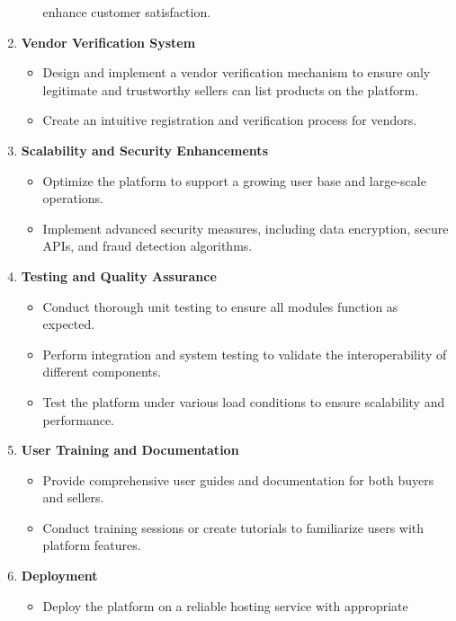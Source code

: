 \documentclass[12pt]{report}
\begin{document}
\begin{enumerate}
\begin{itemize}
		            enhance customer satisfaction.
	      \end{itemize}
	\item \textbf{Vendor Verification System}
	      \begin{itemize}
		      \item Design and implement a vendor verification mechanism to ensure only
		            legitimate and trustworthy sellers can list products on the platform.
		      \item Create an intuitive registration and verification process for vendors.
	      \end{itemize}
	\item \textbf{Scalability and Security Enhancements}
	      \begin{itemize}
		      \item Optimize the platform to support a growing user base and large-scale
		            operations.
		      \item Implement advanced security measures, including data encryption,
		            secure APIs, and fraud detection algorithms.
	      \end{itemize}
	\item \textbf{Testing and Quality Assurance}
	      \begin{itemize}
		      \item Conduct thorough unit testing to ensure all modules function as
		            expected.
		      \item Perform integration and system testing to validate the interoperability
		            of different components.
		      \item Test the platform under various load conditions to ensure scalability
		            and performance.
	      \end{itemize}
	\item \textbf{User Training and Documentation}
	      \begin{itemize}
		      \item Provide comprehensive user guides and documentation for both buyers
		            and sellers.
		      \item Conduct training sessions or create tutorials to familiarize users with
		            platform features.
	      \end{itemize}
	\item \textbf{Deployment}
	      \begin{itemize}
		      \item Deploy the platform on a reliable hosting service with appropriate

\end{itemize}
\end{enumerate}
\end{document}
